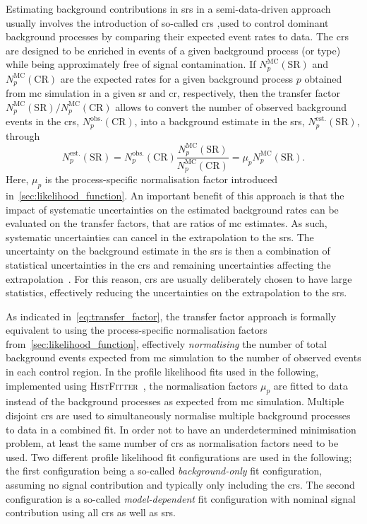 Estimating background contributions in \glspl{sr} in a semi-data-driven approach usually involves the introduction of so-called \glspl{cr} ,used to control dominant background processes by comparing their expected event rates to data. The \glspl{cr} are designed to be enriched in events of a given background process (or type) while being approximately free of signal contamination. If $N_p^\mathrm{MC}(\mathrm{SR})$ and $N_p^\mathrm{MC}(\mathrm{CR})$ are the expected rates for a given background process $p$ obtained from \gls{mc} simulation in a given \gls{sr} and \gls{cr}, respectively, then the transfer factor $N_p^\mathrm{MC}(\mathrm{SR})/N_p^\mathrm{MC}(\mathrm{CR})$ allows to convert the number of observed background events in the \glspl{cr}, $N_p^\mathrm{obs.}(\mathrm{CR})$, into a background estimate in the \glspl{sr}, $N_p^\mathrm{est.}(\mathrm{SR})$, through
\begin{equation}
	N_p^\mathrm{est.}(\mathrm{SR}) = N_p^\mathrm{obs.}(\mathrm{CR}) \frac{N_p^\mathrm{MC}(\mathrm{SR})}{N_p^\mathrm{MC}(\mathrm{CR})} = \mu_p N_p^\mathrm{MC}(\mathrm{SR}).
	\label{eq:transfer_factor}
\end{equation}
Here, $\mu_p$ is the process-specific normalisation factor introduced in~\cref{sec:likelihood_function}. An important benefit of this approach is that the impact of systematic uncertainties on the estimated background rates can be evaluated on the transfer factors, that are ratios of \gls{mc} estimates. As such, systematic uncertainties can cancel in the extrapolation to the \glspl{sr}. The uncertainty on the background estimate in the \glspl{sr} is then a combination of statistical uncertainties in the \glspl{cr} and remaining uncertainties affecting the extrapolation~\cite{HistFitter:2014wma}. For this reason, \glspl{cr} are usually deliberately chosen to have large statistics, effectively reducing the uncertainties on the extrapolation to the \glspl{sr}.  

As indicated in~\cref{eq:transfer_factor}, the transfer factor approach is formally equivalent to using the process-specific normalisation factors from~\cref{sec:likelihood_function}, effectively \textit{normalising} the number of total background events expected from \gls{mc} simulation to the number of observed events in each control region. In the profile likelihood fits used in the following, implemented using \textsc{HistFitter}~\cite{HistFitter:2014wma}, the normalisation factors $\mu_p$ are fitted to data instead of the background processes as expected from \gls{mc} simulation. Multiple disjoint \glspl{cr} are used to simultaneously normalise multiple background processes to data in a combined fit. In order not to have an underdetermined minimisation problem, at least the same number of \glspl{cr} as normalisation factors need to be used. Two different profile likelihood fit configurations are used in the following; the first configuration being a so-called \textit{background-only} fit configuration, assuming no signal contribution and typically only including the \glspl{cr}. The second configuration is a so-called \textit{model-dependent} fit configuration with nominal signal contribution using all \glspl{cr} as well as \glspl{sr}.

